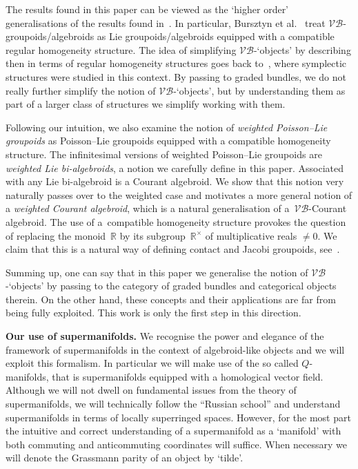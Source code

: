 \documentclass[pdftex]{sigma}
\numberwithin{equation}{section}
\begin{document}
The results found in this paper can  be viewed as the `higher order' generalisations of the results found in~\cite{Bursztyn:2014}. In particular, Bursztyn et al.~\cite{Bursztyn:2014} treat $\mathcal{VB}$-groupoids/algebroids as Lie groupoids/algebroids equipped with a compatible regular homogeneity structure.  The idea of simplifying $\mathcal{VB}$-`objects' by describing then in terms of regular homogeneity structures goes back to~\cite{Grabowski:2006}, where symplectic structures were studied  in this context.  By passing to graded bundles, we do not really  further simplify the notion of $\mathcal{VB}$-`objects', but by understanding them as part of a larger class of structures we simplify working with them.

Following our intuition, we also examine the notion of \emph{weighted Poisson--Lie groupoids} as  Poisson--Lie groupoids equipped with a compatible homogeneity structure. The inf\/initesimal versions of weighted Poisson--Lie groupoids are \emph{weighted Lie bi-algebroids}, a notion we carefully def\/ine in this paper. Associated with any Lie bi-algebroid is a Courant algebroid. We show that this notion very naturally passes over to the weighted case and motivates a more general notion of a \emph{weighted Courant algebroid}, which is a natural generalisation of a~$\mathcal{VB}$-Courant algebroid.  The use of a~compatible homogeneity structure provokes the question of replacing the monoid~${\mathbb R}$ by its subgroup~${\mathbb R}^\times$ of multiplicative reals $\ne 0$. We claim that this is a natural way of def\/ining contact and Jacobi groupoids, see~\cite{Bruce:2015}.

Summing up, one can say that in this paper we generalise the notion of $\mathcal{VB}$-`objects'  by passing to the category of graded bundles and categorical objects therein.  On the other hand, these concepts and their applications are far from being fully exploited. This work is only the f\/irst step in this direction.

\textbf{Our use of supermanifolds.} We recognise the power and elegance of the framework of supermanifolds in the context of algebroid-like objects and we will exploit this formalism. In particular we will make use of the so called $Q$-manifolds, that is supermanifolds equipped with a homological vector f\/ield. Although we will not dwell on fundamental issues from the theory of supermanifolds, we will technically follow the ``Russian school''  and understand supermanifolds in terms of locally superringed spaces. However, for the most part the intuitive and correct understanding of a supermanifold as a `manifold' with both commuting and anticommuting coordinates will suf\/f\/ice. When necessary we will denote the Grassmann parity of an object by `tilde'.
\end{document}
